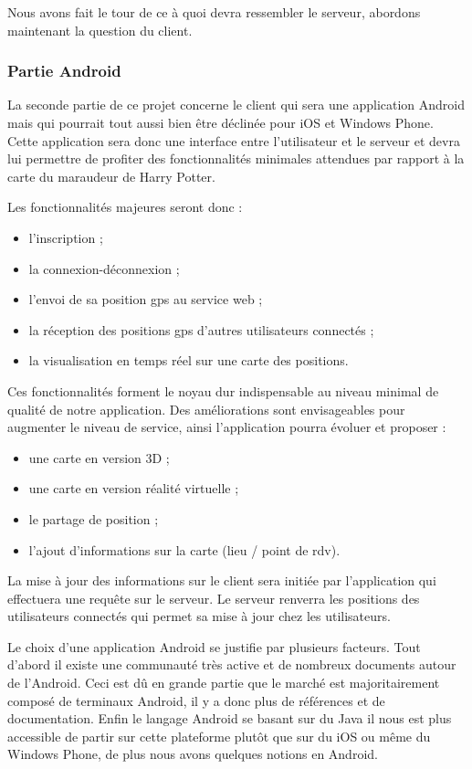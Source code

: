 Nous avons fait le tour de ce à quoi devra ressembler le serveur, abordons maintenant la question du client.

\subsubsection{Partie Android}

La seconde partie de ce projet concerne le client qui sera une application Android mais qui pourrait tout aussi bien être déclinée pour iOS et Windows Phone. Cette application sera donc une interface entre l’utilisateur et le serveur et devra lui permettre de profiter des fonctionnalités minimales attendues par rapport à la carte du maraudeur de Harry Potter.

Les fonctionnalités majeures seront donc :

\begin{itemize}
    \item l’inscription ;
    \item la connexion-déconnexion ;
    \item l’envoi de sa position gps au service web ;
    \item la réception des positions gps d'autres utilisateurs connectés ;
    \item la visualisation en temps réel sur une carte des positions.
\end{itemize}

Ces fonctionnalités forment le noyau dur indispensable au niveau minimal de qualité de notre application. Des améliorations sont envisageables pour augmenter le niveau de service, ainsi l'application pourra évoluer et proposer :

\begin{itemize}
    \item une carte en version 3D ;
    \item une carte en version réalité virtuelle ;
    \item le partage de position ;
    \item l'ajout d'informations sur la carte (lieu / point de rdv).
\end{itemize}

La mise à jour des informations sur le client sera initiée par l’application qui effectuera une requête sur le serveur. Le serveur renverra les positions des utilisateurs connectés qui permet sa mise à jour chez les utilisateurs.

Le choix d'une application Android se justifie par plusieurs facteurs. Tout d’abord il existe une communauté très active et de nombreux documents autour de l’Android. Ceci est dû en grande partie que le marché est majoritairement composé de terminaux Android, il y a donc plus de références et de documentation. Enfin le langage Android se basant sur du Java il nous est plus accessible de partir sur cette plateforme plutôt que sur du iOS ou même du Windows Phone, de plus nous avons quelques notions en Android.

